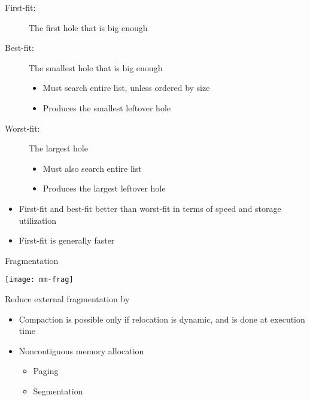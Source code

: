 \begin{frame}%
  \begin{description}
  \item[First-fit:] The first hole that is big enough
  \item[Best-fit:] The smallest hole that is big enough
    \begin{itemize}
    \item Must search entire list, unless ordered by size
    \item Produces the smallest leftover hole
    \end{itemize}
  \item[Worst-fit:] The largest hole
    \begin{itemize}
    \item Must also search entire list
    \item Produces the largest leftover hole
    \end{itemize}
  \end{description}
  \begin{itemize}
  \item First-fit and best-fit better than worst-fit in terms of speed and storage
    utilization
  \item First-fit is generally faster
  \end{itemize}
\end{frame}

\begin{frame}{Fragmentation}
  \begin{minipage}{.35\textwidth}
    \texttt{[image: mm-frag]}
  \end{minipage}\hfill
  \begin{minipage}{.6\textwidth}
    \begin{iblock}{Reduce external fragmentation by}
      \begin{itemize}
      \item \alert{Compaction} is possible only if relocation is dynamic,
        and is done at execution time
      \item \alert{Noncontiguous memory allocation}
        \begin{itemize}
        \item Paging
        \item Segmentation
        \end{itemize}
      \end{itemize}
    \end{iblock}
  \end{minipage}
\end{frame}

